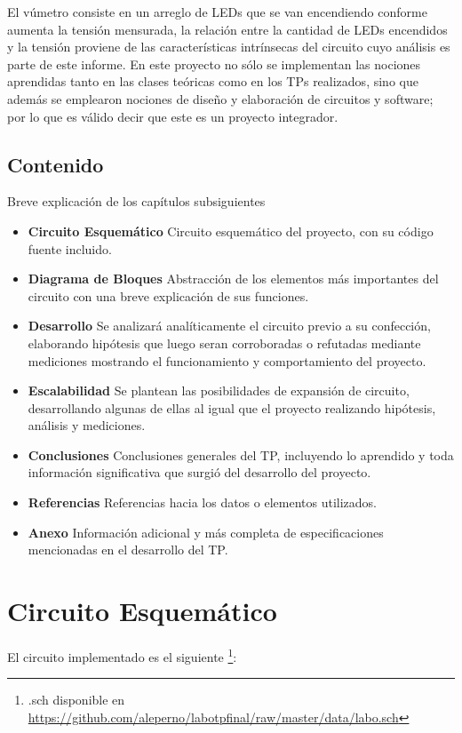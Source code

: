 \documentclass[12pt,a4paper]{article}
\begin{document}
		El vúmetro consiste en un arreglo de LEDs que se van encendiendo conforme aumenta la tensión mensurada, la relación entre la cantidad de LEDs encendidos y la tensión proviene de las características intrínsecas del circuito cuyo análisis es parte de este informe. En este proyecto no sólo se implementan las nociones aprendidas tanto en las clases teóricas  como en los TPs realizados, sino que además se emplearon nociones de diseño y elaboración de circuitos y software; por lo que es válido decir que este es un proyecto integrador.

	\subsection{Contenido}
		Breve explicación de los capítulos subsiguientes
		\begin{itemize}
			\item \textbf{Circuito Esquemático} Circuito esquemático del proyecto, con su código fuente incluido.
			\item \textbf{Diagrama de Bloques} Abstracción de los elementos más importantes del circuito con una breve explicación de sus funciones.
			\item \textbf{Desarrollo} Se analizará analíticamente el circuito previo a su confección, elaborando hipótesis que luego seran corroboradas o refutadas mediante mediciones mostrando el funcionamiento y comportamiento del proyecto.
			\item \textbf{Escalabilidad} Se plantean las posibilidades de expansión de circuito, desarrollando algunas de ellas al igual que el proyecto realizando hipótesis, análisis y mediciones.
			\item \textbf{Conclusiones} Conclusiones generales del TP, incluyendo lo aprendido y toda información significativa que surgió del desarrollo del proyecto.
			\item \textbf{Referencias} Referencias hacia los datos o elementos utilizados.
			\item \textbf{Anexo} Información adicional y más completa de especificaciones mencionadas en el desarrollo del TP.
		\end{itemize}

	\newpage
	\section{Circuito Esquemático}
		El circuito implementado es el siguiente \footnote{.sch disponible en \url{https://github.com/aleperno/labotpfinal/raw/master/data/labo.sch}}:
\end{document}

